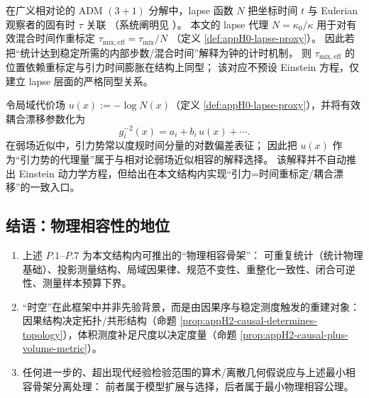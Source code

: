 \begin{hproposition}\label{prop:appH3-lapse-adm}
在广义相对论的 ADM \((3+1)\) 分解中，lapse 函数 \(N\) 把坐标时间 \(t\) 与 Eulerian 观察者的固有时 \(\tau\) 关联
（系统阐明见 \cite{Gourgoulhon2007ThreePlusOne}）。
本文的 lapse 代理 \(N=\kappa_0/\kappa\) 用于对有效混合时间作重标定
\(
\tau_{\mathrm{mix,eff}}=\tau_{\mathrm{mix}}/N
\)
（定义 \ref{def:appH0-lapse-proxy}）。
因此若把“统计达到稳定所需的内部步数/混合时间”解释为钟的计时机制，
则 \(\tau_{\mathrm{mix,eff}}\) 的位置依赖重标定与引力时间膨胀在结构上同型；
该对应不预设 Einstein 方程，仅建立 lapse 层面的严格同型关系。
\end{hproposition}

\begin{hproposition}[局域代价场与有效耦合漂移的兼容性入口]\label{prop:appH3-u-coupling}
令局域代价场 \(u(x):=-\log N(x)\)（定义 \ref{def:appH0-lapse-proxy}），并将有效耦合漂移参数化为
\[
g_i^{-2}(x)=a_i+b_i\,u(x)+\cdots.
\]
在弱场近似中，引力势常以度规时间分量的对数偏差表征；
因此把 \(u(x)\) 作为“引力势的代理量”属于与相对论弱场近似相容的解释选择。
该解释并不自动推出 Einstein 动力学方程，但给出在本文结构内实现“引力=时间重标定/耦合漂移”的一致入口。
\end{hproposition}

\subsection{结语：物理相容性的地位}
\label{subsec:appH4-status}

\begin{enumerate}
  \item 上述 \(P.1\)--\(P.7\) 为本文结构内可推出的“物理相容骨架”：
  可重复统计（统计物理基础）、投影测量结构、局域因果律、规范不变性、重整化一致性、闭合可逆性、测量样本预算下界。
  \item “时空”在此框架中并非先验背景，而是由因果序与稳定测度触发的重建对象：
  因果结构决定拓扑/共形结构（命题 \ref{prop:appH2-causal-determines-topology}），体积测度补足尺度以决定度量（命题 \ref{prop:appH2-causal-plus-volume-metric}）。
  \item 任何进一步的、超出现代经验检验范围的算术/离散几何假说应与上述最小相容骨架分离处理：
  前者属于模型扩展与选择，后者属于最小物理相容公理。
\end{enumerate}

